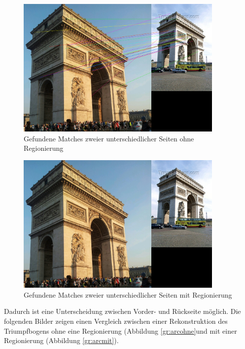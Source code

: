 \begin{figure}[h]
\centering
\includegraphics[width=0.9\textwidth]{gfx/Matchingpaare/matching_109_107.png}
\caption[Gefundene Matches zweier unterschiedlicher Seiten ohne Regionierung]{Gefundene Matches zweier unterschiedlicher Seiten ohne Regionierung}
\label{gr:matchohne}
\end{figure}
\FloatBarrier

\begin{figure}[h]
\centering
\includegraphics[width=0.9\textwidth]{gfx/Matchingpaare/region_109_107.png}
\caption[Gefundene Matches zweier unterschiedlicher Seiten mit Regionierung]{Gefundene Matches zweier unterschiedlicher Seiten mit Regionierung}
\label{gr:matchmit}
\end{figure}
\FloatBarrier

Dadurch ist eine Unterscheidung zwischen Vorder- und R\"uckseite m\"oglich. Die folgenden Bilder zeigen einen Vergleich zwischen einer Rekonstruktion des Triumpfbogens ohne eine Regionierung (Abbildung \ref{gr:arcohne}und mit einer Regionierung (Abbildung \ref{gr:arcmit}).

